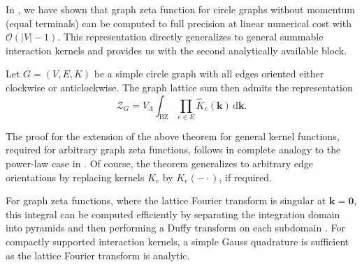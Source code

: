 \documentclass[]{amsart}
\numberwithin{mythm}{section}
\begin{document}
In \cite[Theorem~2.6]{buchheit2025epstein_method}, we have shown that graph zeta function for circle graphs without momentum (equal terminals) can be computed to full precision at linear numerical cost with $\mathcal O(|V|-1)$. This representation directly generalizes to general summable interaction kernels and provides us with the second analytically available block.
\begin{corollary}
    \label{cor:analytic_block_II}
Let $G=(V,E,K)$ be a simple circle graph with all edges oriented either clockwise or anticlockwise. The graph lattice sum then admits the representation
\[
{\mathcal Z}_G= V_\Lambda \int_{\mathrm{BZ}}\prod_{e\in E} {\hat { K}}_e(\bm k)\,\mathrm d \bm k.
\]
\end{corollary}
The proof for the extension of the above theorem for general kernel functions, required for arbitrary graph zeta functions, follows in complete analogy to the power-law case in \cite[Theorem~2.6]{buchheit2025epstein_method}. Of course, the theorem generalizes to arbitrary edge orientations by replacing kernels $K_e$ by $K_e(-\cdot)$, if required.

For graph zeta functions, where the lattice Fourier transform is singular at $\bm k=\bm 0$, this integral can be computed efficiently by separating the integration domain into pyramids and then performing a Duffy transform on each subdomain \cite{duffy1982quadrature}. For compactly supported interaction kernels, a simple Gauss quadrature is sufficient as the lattice Fourier transform is analytic.
\end{document}
